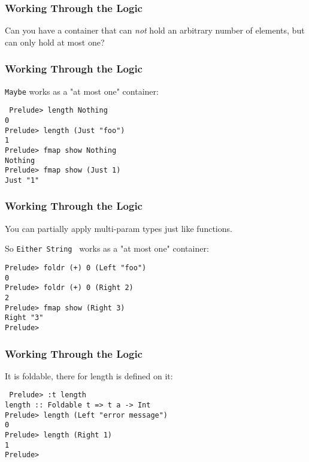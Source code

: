 \documentclass{beamer}
\begin{document}
\begin{frame}
\frametitle{Working Through the Logic}
\begin{center}
{\Large 
Can you have a container that can \textsl{not} hold an arbitrary number
of elements, but can only hold at most one?
}
\end{center}
\end{frame}

\begin{frame}[fragile]
\frametitle{Working Through the Logic}
{\Large
{\tt Maybe} works as a "at most one" container:

\vspace{20pt}

{\tt
Prelude> length Nothing\\
0\\
Prelude> length (Just "foo")\\
1\\
Prelude> fmap show Nothing\\
Nothing\\
Prelude> fmap show (Just 1)\\
Just "1"\\
}}
\end{frame}


\begin{frame}
\frametitle{Working Through the Logic}
{\Large
You can partially apply multi-param types just like functions.

So {\tt Either String } works as a "at most one" container:

{\tt Prelude> foldr (+) 0 (Left "foo") \\
0 \\
Prelude> foldr (+) 0 (Right 2) \\
2 \\
Prelude> fmap show (Right 3) \\
Right "3" \\
Prelude> \\
}}
\end{frame}

\begin{frame}[fragile]
\frametitle{Working Through the Logic}
{\Large
It is foldable, there for length is defined on it:

\vspace{32pt}

{\tt
Prelude> :t length \\
length :: Foldable t => t a -> Int \\
Prelude> length (Left "error message") \\
0 \\
Prelude> length (Right 1) \\
1 \\
Prelude> 
}}
\end{frame}
\end{document}
